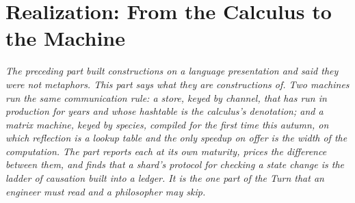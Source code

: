\documentclass[12pt,openright,twoside]{book}
\theoremstyle{remark}
\theoremstyle{plain}
\theoremstyle{remark}
\theoremstyle{plain}
\theoremstyle{plain}
\begin{document}
\bigskip


\part{Realization: From the Calculus to the Machine}
\label{part:realization}

\vspace{1em}
\begin{mdframed}[backgroundcolor=remarkgray, linecolor=gray!60,
                 linewidth=1pt, topline=false, rightline=false,
                 bottomline=false]
\small\itshape
The preceding part built constructions on a language presentation and
said they were not metaphors.
This part says what they are constructions \emph{of}.
Two machines run the same communication rule: a store, keyed by channel,
that has run in production for years and whose hashtable is the
calculus's denotation; and a matrix machine, keyed by species, compiled
for the first time this autumn, on which reflection is a lookup table and
the only speedup on offer is the width of the computation.
The part reports each at its own maturity, prices the difference between
them, and finds that a shard's protocol for checking a state change is
the ladder of causation built into a ledger.
It is the one part of the Turn that an engineer must read and a
philosopher may skip.
\end{mdframed}
\end{document}
